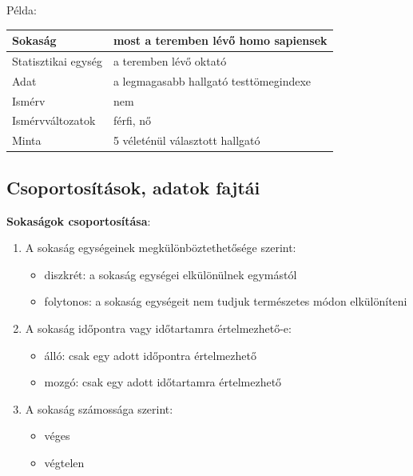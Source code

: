 \documentclass[12pt]{article}
\begin{document}
    Példa:
    \begin{table}[ht]
        \centering
        \begin{tabular}{|l|l|}
            \hline
            Sokaság & most a teremben lévő homo sapiensek \\ \hline
            Statisztikai egység & a teremben lévő oktató \\ \hline
            Adat & a legmagasabb hallgató testtömegindexe \\ \hline
            Ismérv & nem \\ \hline
            Ismérvváltozatok & férfi, nő \\ \hline
            Minta & 5 véleténül választott hallgató \\ \hline
        \end{tabular}
    \end{table}
    
    \subsection{Csoportosítások, adatok fajtái}
    \textbf{Sokaságok csoportosítása}:
    \begin{enumerate}
        \item A sokaság egységeinek megkülönböztethetősége szerint:
        \begin{itemize}
            \item diszkrét: a sokaság egységei elkülönülnek egymástól
            \item folytonos: a sokaság egységeit nem tudjuk természetes módon elkülöníteni
        \end{itemize}
        \item A sokaság időpontra vagy időtartamra értelmezhető-e:
        \begin{itemize}
            \item álló: csak egy adott időpontra értelmezhető
            \item mozgó: csak egy adott időtartamra értelmezhető
        \end{itemize}
        \item A sokaság számossága szerint:
        \begin{itemize}
            \item véges
            \item végtelen
        \end{itemize}
    \end{enumerate}
\end{document}
